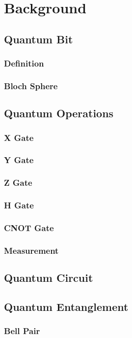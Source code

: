 \chapter{Background}
\label{background}

\section{Quantum Bit}
\subsection{Definition}
\subsection{Bloch Sphere}

\section{Quantum Operations}
\subsection{X Gate}
\subsection{Y Gate}
\subsection{Z Gate}
\subsection{H Gate}
\subsection{CNOT Gate}
\subsection{Measurement}

\section{Quantum Circuit}
\section{Quantum Entanglement}
\subsection{Bell Pair}
